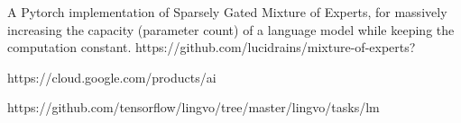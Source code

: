 

A Pytorch implementation of Sparsely Gated Mixture of Experts, for massively 
increasing the capacity (parameter count) of a language model while keeping 
the computation constant.
https://github.com/lucidrains/mixture-of-experts?

https://cloud.google.com/products/ai

https://github.com/tensorflow/lingvo/tree/master/lingvo/tasks/lm